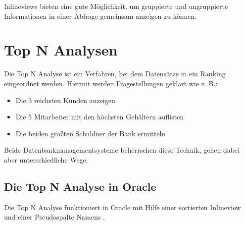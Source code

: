 \begin{merke}
    Inlineviews bieten eine gute Möglichkeit, um gruppierte und ungruppierte Informationen in einer Abfrage gemeinsam anzeigen zu können.
\end{merke}
\section{Top N Analysen}
Die Top N Analyse ist ein Verfahren, bei dem Datensätze in ein Ranking eingeordnet werden. Hiermit werden Fragestellungen geklärt wie z. B.:
\begin{itemize}
    \item Die 3 reichsten Kunden anzeigen
    \item Die 5 Mitarbeiter mit den höchsten Gehältern auflisten
    \item Die beiden größten Schuldner der Bank ermitteln
\end{itemize}
Beide Datenbankmanagementsysteme beherrschen diese Technik, gehen dabei aber unterschiedliche Wege.
\subsection{Die Top N Analyse in Oracle}
Die Top N Analyse funktioniert in Oracle mit Hilfe einer sortierten Inlineview und einer Pseudospalte Namens .
